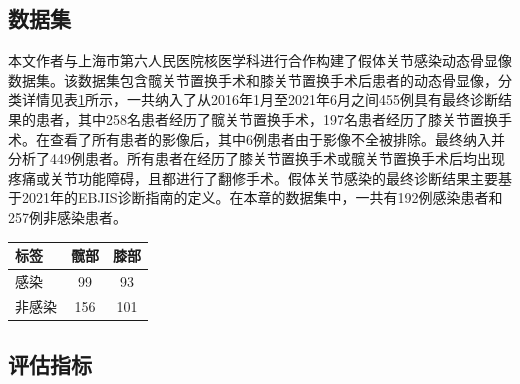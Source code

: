 \subsection{数据集}

本文作者与上海市第六人民医院核医学科进行合作构建了假体关节感染动态骨显像数据集。该数据集包含髋关节置换手术和膝关节置换手术后患者的动态骨显像，分类详情见表\ref{tab:chap03_dataset}所示，一共纳入了从2016年1月至2021年6月之间455例具有最终诊断结果的患者，其中258名患者经历了髋关节置换手术，197名患者经历了膝关节置换手术。在查看了所有患者的影像后，其中6例患者由于影像不全被排除。最终纳入并分析了449例患者。所有患者在经历了膝关节置换手术或髋关节置换手术后均出现疼痛或关节功能障碍，且都进行了翻修手术。假体关节感染的最终诊断结果主要基于2021年的EBJIS诊断指南的定义\cite{mcnally2021ebjis}。在本章的数据集中，一共有192例感染患者和257例非感染患者。

\begin{table}[htbp]
  \centering
  \begin{tabular}{lcc}
    \toprule
    标签   & 髋部 & 膝部 \\
    \midrule
    感染   & 99   & 93   \\
    非感染 & 156  & 101  \\
    \bottomrule
  \end{tabular}
  \label{tab:chap03_dataset}
\end{table}

\subsection{评估指标}

